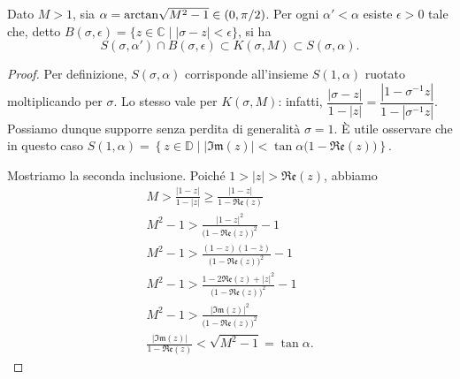 \begin{prop} \label{settori-stolz}
  Dato $M>1$, sia $\alpha=\text{\normalfont{arctan}}\sqrt{M^2-1} \in (0,\pi/2)$. Per ogni $\alpha'<\alpha$ esiste $\epsilon>0$ tale che, detto $B(\sigma,\epsilon)=\{z \in \mathbb{C} \mid |\sigma-z|<\epsilon\}$, si ha
  $$S(\sigma,\alpha')\cap B(\sigma,\epsilon) \subset K(\sigma,M) \subset S(\sigma,\alpha).$$
\end{prop}

\begin{proof}
  Per definizione, $S(\sigma,\alpha)$ corrisponde all'insieme $S(1,\alpha)$ ruotato moltiplicando per $\sigma$. Lo stesso vale per $K(\sigma,M)$: infatti, $\dfrac{|\sigma-z|}{1-|z|}=\dfrac{|1-\sigma^{-1}z|}{1-|\sigma^{-1}z|}$. Possiamo dunque supporre senza perdita di generalità $\sigma=1$. È utile osservare che in questo caso $S(1,\alpha)=\left\{z \in \mathbb{D} \mid |\mathfrak{Im}(z)|<\tan{\alpha}\bigl(1-\mathfrak{Re}(z)\bigr)\right\}$.

  Mostriamo la seconda inclusione. Poiché $1>|z|>\mathfrak{Re}(z)$, abbiamo
  \begin{gather*}
    M>\frac{|1-z|}{1-|z|}\ge \frac{|1-z|}{1-\mathfrak{Re}(z)} \\
    M^2-1 > \frac{|1-z|^2}{\bigl(1-\mathfrak{Re}(z)\bigr)^2}-1 \\
    M^2-1 > \frac{(1-z)(1-\bar{z})}{\bigl(1-\mathfrak{Re}(z)\bigr)^2}-1 \\
    M^2-1 > \frac{1-2\mathfrak{Re}(z)+|z|^2}{\bigl(1-\mathfrak{Re}(z)\bigr)^2}-1 \\
    M^2-1 > \frac{|\mathfrak{Im}(z)|^2}{\bigl(1-\mathfrak{Re}(z)\bigr)^2} \\
    \frac{|\mathfrak{Im}(z)|}{1-\mathfrak{Re}(z)}<\sqrt{M^2-1}=\tan{\alpha}.
  \end{gather*}


\end{proof}
